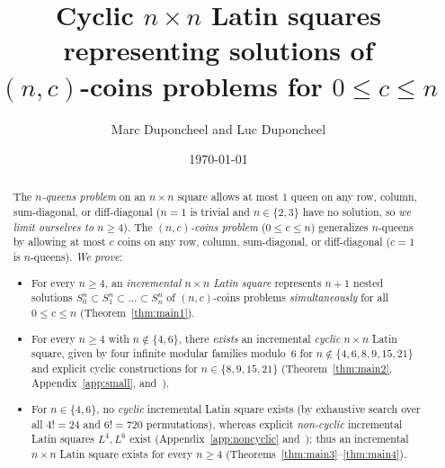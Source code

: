 \documentclass[10pt,a4paper]{article}
\title{\textbf{
  Cyclic $n \!\times\! n$ Latin squares \\ 
  representing solutions of \\
  $(n,c)$-coins problems for $0 \le c \le n$
}}
\author{Marc Duponcheel and Luc Duponcheel}
\date{\today}
\theoremstyle{remark}
\begin{document}
\maketitle

\begin{abstract}

\noindent The \emph{$n$-queens problem} on an $n \!\times\! n$ square allows at most $1$ queen on any
row, column, sum-diagonal, or diff-diagonal ($n = 1$ is trivial and $n \in \{2,3\}$ have no solution,
so \emph{we limit ourselves to $n \ge 4$}). The \emph{$(n,c)$-coins problem} ($0 \le c \le n$)
generalizes $n$-queens by allowing at most $c$ coins on any row, column, sum-diagonal, or
diff-diagonal ($c = 1$ is $n$-queens). \emph{We prove}:
\begin{itemize}[nosep]
\item For every $n \ge 4$, an \emph{incremental $n \!\times\! n$ Latin square} represents $n + 1$
nested solutions $S^n_0 \subset S^n_1 \subset \dots \subset S^n_n$ of $(n,c)$-coins problems
\emph{simultaneously} for all $0 \le c \le n$ (Theorem~\ref{thm:main1}).
\item For every $n \ge 4$ with $n \notin \{4, 6\}$, there \emph{exists} an incremental \emph{cyclic}
$n \!\times\! n$ Latin square, given by four infinite modular families modulo~$6$ for
$n \notin \{4, 6, 8, 9, 15, 21\}$ and explicit cyclic constructions for $n \in \{8, 9, 15, 21\}$
(Theorem~\ref{thm:main2}, Appendix~\ref{app:small}, and~\cite{PalomarLean,CompanionRepo}).
\item For $n \in \{4, 6\}$, no \emph{cyclic} incremental Latin square exists (by exhaustive search
over all $4! = 24$ and $6! = 720$ permutations), whereas explicit \emph{non-cyclic} incremental Latin
squares $L^4, L^6$ exist (Appendix~\ref{app:noncyclic} and~\cite{PalomarLean,CompanionRepo}); thus an
incremental $n \!\times\! n$ Latin square exists for every $n \ge 4$ (Theorems~\ref{thm:main3}--\ref{thm:main4}).
\end{itemize}


\end{abstract}
\end{document}
